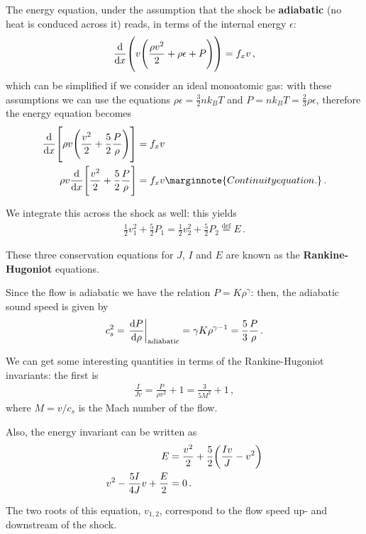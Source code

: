 \documentclass[main.tex]{subfiles}
\begin{document}
The energy equation, under the assumption that the shock be \textbf{adiabatic} (no heat is conduced across it) reads, in terms of the internal energy \(\epsilon \): 
%
\begin{align}
\dv{}{x} \qty(v \qty(\frac{\rho v^2}{2} + \rho \epsilon + P)) = f_x v
\,,
\end{align}
%
which can be simplified if we consider an ideal monoatomic gas: with these assumptions we can use the equations \(\rho \epsilon = \frac{3}{2} n k_B T\) and \(P = n k_B T = \frac{2}{3} \rho \epsilon \), therefore the energy equation becomes 
%
\begin{align}
\dv{}{x} \qty[ \rho v \qty( \frac{v^2}{2} + \frac{5}{2} \frac{P}{\rho } )] &= f_x v  \\
\rho v \dv{}{x} \qty[ \frac{v^2}{2} + \frac{5}{2} \frac{P}{\rho }]&= f_x v 
\marginnote{Continuity equation.}
\,.
\end{align}

We integrate this across the shock as well: this yields 
%
\begin{align}
\frac{1}{2} v_1^2 + \frac{5}{2} P_1 =
\frac{1}{2} v_2^2 + \frac{5}{2} P_2
\overset{\text{def}}{=} E 
\,.
\end{align}

These three conservation equations for \(J\), \(I\) and \(E\) are known as the \textbf{Rankine-Hugoniot} equations. 

Since the flow is adiabatic we have the relation \(P = K \rho^{\gamma }\): then, the adiabatic sound speed is given by 
%
\begin{align}
c_s^2 = \eval{\dv{P}{\rho }}_{\text{adiabatic}} = \gamma K \rho^{\gamma -1} = \frac{5}{3} \frac{P}{\rho }
\,.
\end{align}

We can get some interesting quantities in terms of the Rankine-Hugoniot invariants: the first is 
%
\begin{align}
\frac{I}{Jv} = \frac{P}{\rho v^2} + 1 = \frac{3}{5 M^2} + 1 
\,,
\end{align}
%
where \(M = v / c_s\) is the Mach number of the flow. 

Also, the energy invariant can be written as 
%
\begin{align}
E &= \frac{v^2}{2} + \frac{5}{2} \qty(\frac{Iv}{J} - v^2)  \\
v^2 - \frac{5I}{4J} v + \frac{E}{2} &= 0 
\,.
\end{align}

The two roots of this equation, \(v_{1, 2}\), correspond to the flow speed up- and downstream of the shock.
\end{document}
